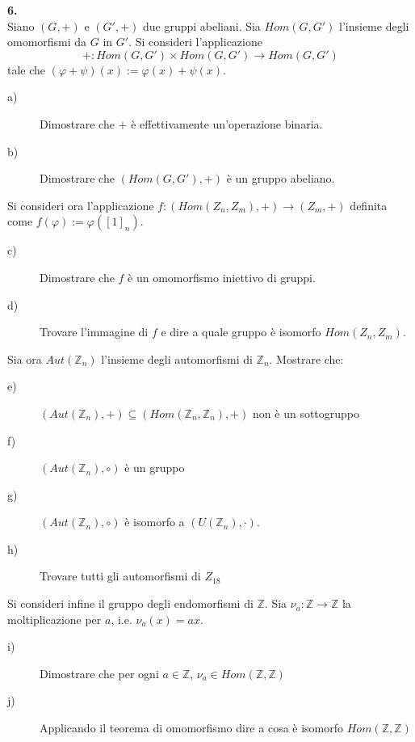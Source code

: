 \documentclass[italian,a4paper,11pt]
{article}
\newcommand{\Z}{\mathbb Z}
\begin{document}
\vspace{0.4 cm}
\noindent
\begin{Ex}\textbf{ 6.}\\
Siano $(G, +)$ e $(G', +)$ due gruppi abeliani. Sia $Hom(G,G')$ l'insieme degli
omomorfismi da $G$ in $G'$. Si consideri l'applicazione
$$ + : Hom(G,G') \times Hom(G,G') \longrightarrow Hom(G,G') $$
tale che $(\varphi + \psi )(x) := \varphi(x) + \psi(x)$.
\begin{description}
\item[a)] Dimostrare che $+$ \`e effettivamente un'operazione binaria.
\item[b)] Dimostrare che $(Hom(G,G'), +)$ \`e un gruppo abeliano.
\end{description}
Si consideri ora l'applicazione $f : (Hom(Z_n,Z_m), +) \rightarrow (Z_m, +)$ definita
come $f(\varphi) := \varphi([1]_n)$.
\begin{description}
\item[c)] Dimostrare che $f$ \`e un omomorfismo iniettivo di gruppi.
\item[d)] Trovare l'immagine di $f$ e dire a quale gruppo \`e isomorfo $Hom(Z_n,Z_m)$.
\end{description}
Sia ora $Aut(\Z_n)$ l'insieme degli automorfismi di $\Z_n$. Mostrare che:
\begin{description}
\item[e)] $(Aut(\Z_n), +) \subseteq (Hom(\Z_n,\Z_n), +)$ non \`e un sottogruppo
\item[f)] $(Aut(\Z_n), \circ)$ \`e un gruppo
\item[g)] $(Aut(\Z_n), \circ)$ \`e isomorfo a $(U(\Z_n), \cdot)$.
\item[h)] Trovare tutti gli automorfismi di $Z_{18}$
\end{description}
Si consideri infine il gruppo degli endomorfismi di $\Z$. Sia $\nu_a : \Z \rightarrow \Z$ la
moltiplicazione per $a$, i.e. $\nu_a(x) = ax$.
\begin{description}
\item[i)] Dimostrare che per ogni $a \in \Z$, $\nu_a \in Hom(\Z,\Z)$
\item[j)] Applicando il teorema di omomorfismo dire a cosa \`e isomorfo $Hom(\Z,\Z)$
\end{description}
\end{Ex}
\end{document}
